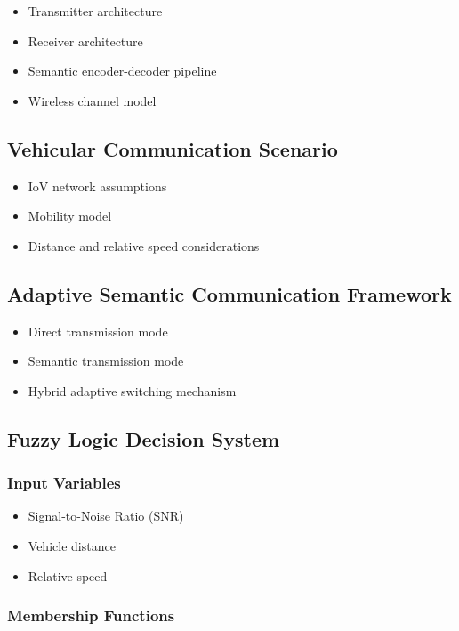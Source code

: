 \documentclass[lettersize,journal]{IEEEtran}
\begin{document}
\begin{itemize}
    \item Transmitter architecture
    \item Receiver architecture
    \item Semantic encoder-decoder pipeline
    \item Wireless channel model
\end{itemize}

\subsection{Vehicular Communication Scenario}

\begin{itemize}
    \item IoV network assumptions
    \item Mobility model
    \item Distance and relative speed considerations
\end{itemize}

\subsection{Adaptive Semantic Communication Framework}

\begin{itemize}
    \item Direct transmission mode
    \item Semantic transmission mode
    \item Hybrid adaptive switching mechanism
\end{itemize}

\subsection{Fuzzy Logic Decision System}

\subsubsection{Input Variables}

\begin{itemize}
    \item Signal-to-Noise Ratio (SNR)
    \item Vehicle distance
    \item Relative speed
\end{itemize}

\subsubsection{Membership Functions}
\end{document}

